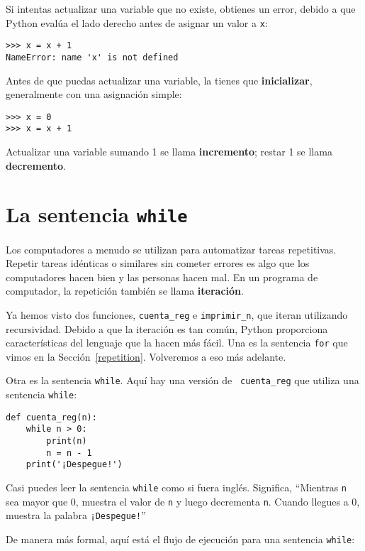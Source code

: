 \documentclass[10pt]{book}
\begin{document}
Si intentas actualizar una variable que no existe, obtienes un
error, debido a que Python evalúa el lado derecho antes de asignar
un valor a {\tt x}:

\begin{verbatim}
>>> x = x + 1
NameError: name 'x' is not defined
\end{verbatim}
%
Antes de que puedas actualizar una variable, la tienes que {\bf inicializar},
generalmente con una asignación simple:

\begin{verbatim}
>>> x = 0
>>> x = x + 1
\end{verbatim}
%
Actualizar una variable sumando 1 se llama {\bf incremento};
restar 1 se llama {\bf decremento}.




\section{La sentencia {\tt while}}

Los computadores a menudo se utilizan para automatizar tareas repetitivas.  Repetir
tareas idénticas o similares sin cometer errores es algo que
los computadores hacen bien y las personas hacen mal.  En un programa de computador,
la repetición también se llama {\bf iteración}.

Ya hemos visto dos funciones, {\tt cuenta\_reg} e
\verb"imprimir_n", que iteran utilizando recursividad.  Debido a que la iteración es tan
común, Python proporciona características del lenguaje que la hacen más fácil.
Una es la sentencia {\tt for} que vimos en la Sección~\ref{repetition}.
Volveremos a eso más adelante.

Otra es la sentencia {\tt while}.  Aquí hay una versión de {\tt
cuenta\_reg} que utiliza una sentencia {\tt while}:

\begin{verbatim}
def cuenta_reg(n):
    while n > 0:
        print(n)
        n = n - 1
    print('¡Despegue!')
\end{verbatim}
%
Casi puedes leer la sentencia {\tt while} como si fuera inglés.
Significa, ``Mientras {\tt n} sea mayor que 0,
muestra el valor de {\tt n} y luego decrementa
{\tt n}.  Cuando llegues a 0, muestra la palabra {\tt ¡Despegue!}''

De manera más formal, aquí está el flujo de ejecución para una sentencia {\tt while}:
\end{document}
